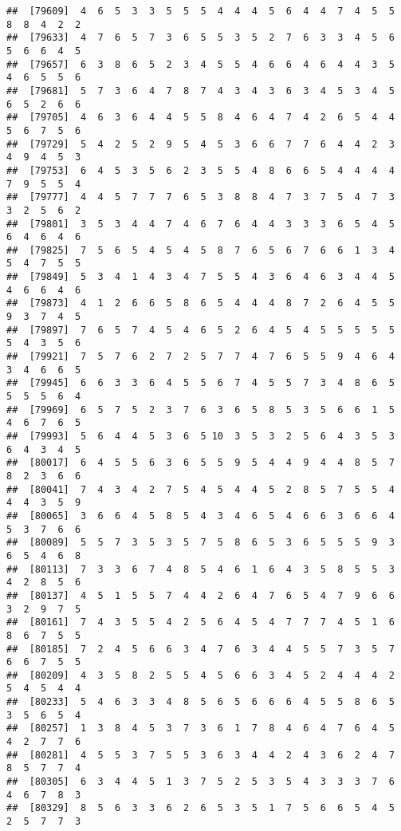 \documentclass[
]{book}
\begin{document}
\begin{verbatim}
##  [79609]  4  6  5  3  3  5  5  5  4  4  4  5  6  4  4  7  4  5  5  8  8  4  2  2
##  [79633]  4  7  6  5  7  3  6  5  5  3  5  2  7  6  3  3  4  5  6  5  6  6  4  5
##  [79657]  6  3  8  6  5  2  3  4  5  5  4  6  6  4  6  4  4  3  5  4  6  5  5  6
##  [79681]  5  7  3  6  4  7  8  7  4  3  4  3  6  3  4  5  3  4  5  6  5  2  6  6
##  [79705]  4  6  3  6  4  4  5  5  8  4  6  4  7  4  2  6  5  4  4  5  6  7  5  6
##  [79729]  5  4  2  5  2  9  5  4  5  3  6  6  7  7  6  4  4  2  3  4  9  4  5  3
##  [79753]  6  4  5  3  5  6  2  3  5  5  4  8  6  6  5  4  4  4  4  7  9  5  5  4
##  [79777]  4  4  5  7  7  7  6  5  3  8  8  4  7  3  7  5  4  7  3  3  2  5  6  2
##  [79801]  3  5  3  4  4  7  4  6  7  6  4  4  3  3  3  6  5  4  5  6  4  6  4  6
##  [79825]  7  5  6  5  4  5  4  5  8  7  6  5  6  7  6  6  1  3  4  5  4  7  5  5
##  [79849]  5  3  4  1  4  3  4  7  5  5  4  3  6  4  6  3  4  4  5  4  6  6  4  6
##  [79873]  4  1  2  6  6  5  8  6  5  4  4  4  8  7  2  6  4  5  5  9  3  7  4  5
##  [79897]  7  6  5  7  4  5  4  6  5  2  6  4  5  4  5  5  5  5  5  5  4  3  5  6
##  [79921]  7  5  7  6  2  7  2  5  7  7  4  7  6  5  5  9  4  6  4  3  4  6  6  5
##  [79945]  6  6  3  3  6  4  5  5  6  7  4  5  5  7  3  4  8  6  5  5  5  5  6  4
##  [79969]  6  5  7  5  2  3  7  6  3  6  5  8  5  3  5  6  6  1  5  4  6  7  6  5
##  [79993]  5  6  4  4  5  3  6  5 10  3  5  3  2  5  6  4  3  5  3  6  4  3  4  5
##  [80017]  6  4  5  5  6  3  6  5  5  9  5  4  4  9  4  4  8  5  7  8  2  3  6  6
##  [80041]  7  4  3  4  2  7  5  4  5  4  4  5  2  8  5  7  5  5  4  4  4  3  5  9
##  [80065]  3  6  6  4  5  8  5  4  3  4  6  5  4  6  6  3  6  6  4  5  3  7  6  6
##  [80089]  5  5  7  3  5  3  5  7  5  8  6  5  3  6  5  5  5  9  3  6  5  4  6  8
##  [80113]  7  3  3  6  7  4  8  5  4  6  1  6  4  3  5  8  5  5  3  4  2  8  5  6
##  [80137]  4  5  1  5  5  7  4  4  2  6  4  7  6  5  4  7  9  6  6  3  2  9  7  5
##  [80161]  7  4  3  5  5  4  2  5  6  4  5  4  7  7  7  4  5  1  6  8  6  7  5  5
##  [80185]  7  2  4  5  6  6  3  4  7  6  3  4  4  5  5  7  3  5  7  6  6  7  5  5
##  [80209]  4  3  5  8  2  5  5  4  5  6  6  3  4  5  2  4  4  4  2  5  4  5  4  4
##  [80233]  5  4  6  3  3  4  8  5  6  5  6  6  6  4  5  5  8  6  5  3  5  6  5  4
##  [80257]  1  3  8  4  5  3  7  3  6  1  7  8  4  6  4  7  6  4  5  4  2  7  7  6
##  [80281]  4  5  5  3  7  5  5  3  6  3  4  4  2  4  3  6  2  4  7  8  5  7  7  4
##  [80305]  6  3  4  4  5  1  3  7  5  2  5  3  5  4  3  3  3  7  6  4  6  7  8  3
##  [80329]  8  5  6  3  3  6  2  6  5  3  5  1  7  5  6  6  5  4  5  2  5  7  7  3

\end{verbatim}
\end{document}
